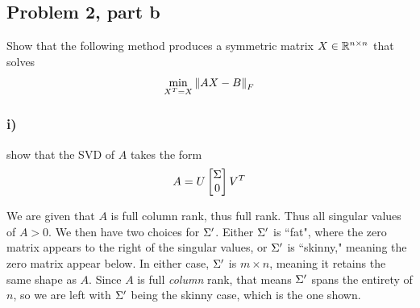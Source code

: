 \newpage
\subsection{Problem 2, part b}
Show that the following method produces a symmetric matrix $X \in \mathbb{R}^{n \times n}$ that solves 
\[
\min_{X^T = X} \norm{AX - B}_F
\]
\subsubsection{i)}
show that the SVD of $A$ takes the form
\[
A = U\begin{bmatrix}\Sigma \\ 0\end{bmatrix}V^T
\]
\partbreak
\begin{solution}

    We are given that $A$ is full column rank, thus full rank. Thus all singular values of $A > 0$. We then have two choices for $\Sigma '$. Either $\Sigma '$ is ``fat", where the zero matrix appears to the right of the singular values, or $\Sigma'$ is ``skinny," meaning the zero matrix appear below. In either case, $\Sigma'$ is $m \times n$, meaning it retains the same shape as $A$. Since $A$ is full \textit{column} rank, that means $\Sigma'$ spans the entirety of $n$, so we are left with $\Sigma'$ being the skinny case, which is the one shown.
\end{solution}
